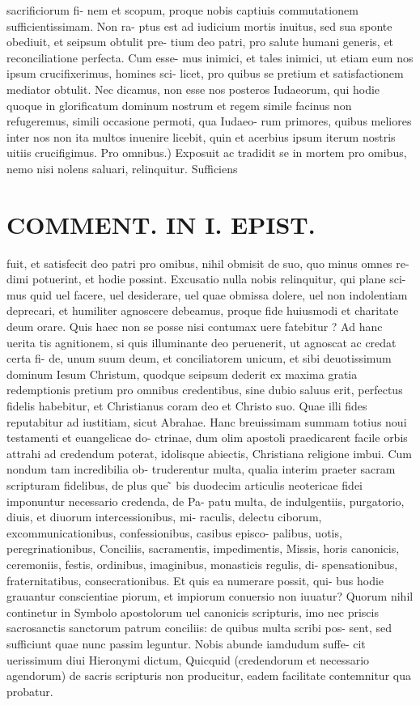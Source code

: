 \documentclass{article}
\begin{document}
\begin{pages}
sacrificiorum fi- nem et scopum, proque nobis captiuis commutationem sufficientissimam. Non ra- ptus est ad iudicium mortis inuitus, sed sua sponte obediuit, et seipsum obtulit pre- tium deo patri, pro salute humani generis, et reconciliatione perfecta. Cum esse- mus inimici, et tales inimici, ut etiam eum nos ipsum crucifixerimus, homines sci- licet, pro quibus se pretium et satisfactionem mediator obtulit. Nec dicamus, non esse nos posteros Iudaeorum, qui hodie quoque in glorificatum dominum nostrum et regem simile facinus non refugeremus, simili occasione permoti, qua Iudaeo- rum primores, quibus meliores inter nos non ita multos inuenire licebit, quin et acerbius ipsum iterum nostris uitiis crucifigimus. Pro omnibus.) Exposuit ac tradidit se in mortem pro omibus, nemo nisi nolens saluari, relinquitur. Sufficiens  \pend
\section*{COMMENT. IN I. EPIST. }
\marginpar{[ p.484 ]}\pstart fuit, et satisfecit deo patri pro omibus, nihil obmisit de suo, quo minus omnes re- dimi potuerint, et hodie possint. Excusatio nulla nobis relinquitur, qui plane sci- mus quid uel facere, uel desiderare, uel quae obmissa dolere, uel non indolentiam deprecari, et humiliter agnoscere debeamus, proque fide huiusmodi et charitate deum orare. Quis haec non se posse nisi contumax uere fatebitur ? Ad hanc uerita tis agnitionem, si quis illuminante deo peruenerit, ut agnoscat ac credat certa fi- de, unum suum deum, et conciliatorem unicum, et sibi deuotissimum dominum Iesum Christum, quodque seipsum dederit ex maxima gratia redemptionis pretium pro omnibus credentibus, sine dubio saluus erit, perfectus fidelis habebitur, et Christianus coram deo et Christo suo. Quae illi fides reputabitur ad iustitiam, sicut Abrahae. Hanc breuissimam summam totius noui testamenti et euangelicae do- ctrinae, dum olim apostoli praedicarent facile orbis attrahi ad credendum poterat, idolisque abiectis, Christiana religione imbui. Cum nondum tam incredibilia ob- truderentur multa, qualia interim praeter sacram scripturam fidelibus, de plus que ̃ bis duodecim articulis neotericae fidei imponuntur necessario credenda, de Pa- patu multa, de indulgentiis, purgatorio, diuis, et diuorum intercessionibus, mi- raculis, delectu ciborum, excommunicationibus, confessionibus, casibus episco- palibus, uotis, peregrinationibus, Conciliis, sacramentis, impedimentis, Missis, horis canonicis, ceremoniis, festis, ordinibus, imaginibus, monasticis regulis, di- spensationibus, fraternitatibus, consecrationibus. Et quis ea numerare possit, qui- bus hodie grauantur conscientiae piorum, et impiorum conuersio non iuuatur? Quorum nihil continetur in Symbolo apostolorum uel canonicis scripturis, imo nec priscis sacrosanctis sanctorum patrum conciliis: de quibus multa scribi pos- sent, sed sufficiunt quae nunc passim leguntur. Nobis abunde iamdudum suffe- cit uerissimum diui Hieronymi dictum, Quicquid (credendorum et necessario agendorum) de sacris scripturis non producitur, eadem facilitate contemnitur qua probatur.  \pend

\end{pages}
\end{document}
